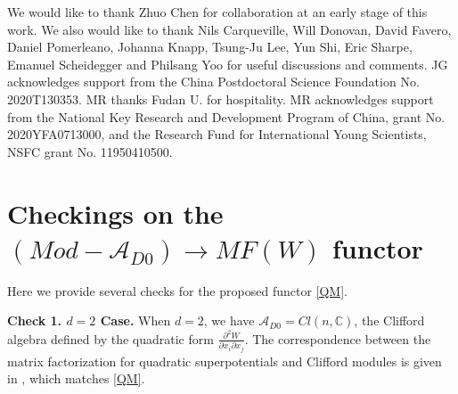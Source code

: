 \documentclass[a4paper,11pt]{article}
\def\cA{\mathcal{A}}
\numberwithin{equation}{section}
\begin{document}
We would like to thank Zhuo Chen for collaboration at an early stage
of this work. We also would like to thank Nils Carqueville, Will Donovan,
David Favero, Daniel Pomerleano, Johanna Knapp, Tsung-Ju Lee, Yun Shi,
Eric Sharpe, Emanuel Scheidegger and Philsang Yoo for useful discussions and 
comments. JG acknowledges support from the China Postdoctoral Science Foundation 
No. 2020T130353. MR thanks Fudan U. for hospitality. MR acknowledges support 
from the National Key Research and Development Program of China, grant No. 
2020YFA0713000, and the Research Fund for International Young Scientists, NSFC 
grant No. 11950410500.


\appendix

\section{Checkings on the $(Mod-\mathcal{A}_{D0})\rightarrow MF(W)$ 
functor}\label{app:checks}

Here we provide several checks for the proposed functor \eqref{QM}. 

{\bf Check 1. $d=2$ Case.} When $d=2$, we have $\cA_{D0} = Cl(n,\mathbb{C})$, 
the 
Clifford algebra defined by the quadratic form $\frac{\partial^2 W}{\partial 
x_i 
\partial x_j}$. The correspondence between the matrix factorization for 
quadratic superpotentials and Clifford modules is given in 
\cite{Kapustin:2002bi,Bertin:2008osh}, which matches \eqref{QM}.
\end{document}
